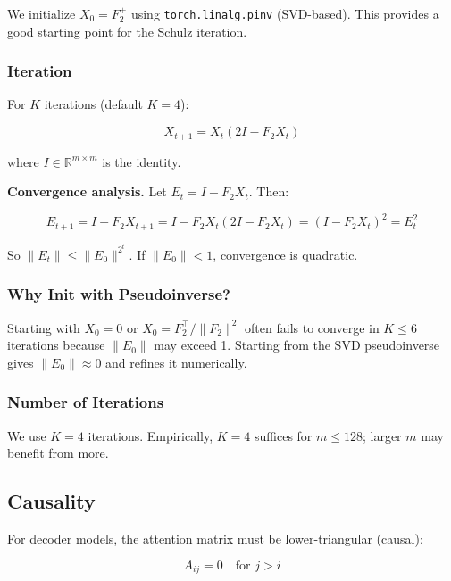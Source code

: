 We initialize $X_0 = F_2^+$ using \texttt{torch.linalg.pinv} (SVD-based). This 
provides a good starting point for the Schulz iteration.

\subsubsection{Iteration}

For $K$ iterations (default $K = 4$):

\begin{equation}
X_{t+1} = X_t (2I - F_2 X_t)
\end{equation}

where $I \in \mathbb{R}^{m \times m}$ is the identity.

\textbf{Convergence analysis.} Let $E_t = I - F_2 X_t$. Then:

\begin{equation}
E_{t+1} = I - F_2 X_{t+1} = I - F_2 X_t (2I - F_2 X_t) = (I - F_2 X_t)^2 = E_t^2
\end{equation}

So $\|E_t\| \le \|E_0\|^{2^t}$. If $\|E_0\| < 1$, convergence is quadratic.

\subsubsection{Why Init with Pseudoinverse?}

Starting with $X_0 = 0$ or $X_0 = F_2^\top / \|F_2\|^2$ often fails to 
converge in $K \le 6$ iterations because $\|E_0\|$ may exceed 1. Starting 
from the SVD pseudoinverse gives $\|E_0\| \approx 0$ and refines it 
numerically.

\subsubsection{Number of Iterations}

We use $K = 4$ iterations. Empirically, $K = 4$ suffices for 
$m \le 128$; larger $m$ may benefit from more.

\subsection{Causality}

For decoder models, the attention matrix must be lower-triangular (causal):

\begin{equation}
A_{ij} = 0 \quad \text{for } j > i
\end{equation}

